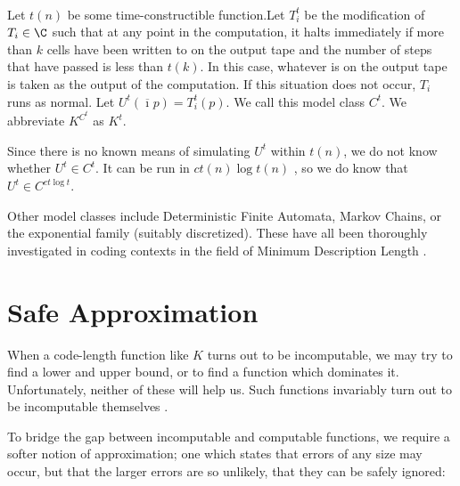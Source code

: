 \renewcommand*{\thefootnote}{\arabic{footnote}}

\begin{example}
\label{example:traditional-time-bounded}
\-\\ Let $t(n)$ be some time-constructible function.\footnotemark Let $T_i^t$ be the modification of $T_i \in \C$ such that at any point in the computation, it halts immediately if more than $k$ cells have been written to on the output tape and the number of steps that have passed is less than $t(k)$. In this case, whatever is on the output tape is taken as the output of the computation. If this situation does not occur, $T_i$ runs as normal. Let $U^t(\overline{\imath}p) = T^t_i(p)$. We call this model class $C^t$. We abbreviate $K^{C^t}$ as $K^t$. 

Since there is no known means of simulating $U^t$ within $t(n)$, we do not know whether $U^t \in C^t$. It can be run in $ct(n) \log t(n)$ \cite{DBLP:books/daglib/0087328,DBLP:journals/jacm/HennieS66}, so we do know that $U^t \in C^{ct\log t}$.
\end{example}


\noindent Other model classes include Deterministic Finite Automata, Markov Chains, or the exponential family (suitably discretized). These have all been thoroughly investigated in coding contexts in the field of Minimum Description Length \cite{grunwald2007minimum}.

\renewcommand*{\thefootnote}{\fnsymbol{footnote}}

\section{Safe Approximation}

When a code-length function like $K$ turns out to be incomputable, we may try to find a lower and upper bound, or to find a function which dominates it. Unfortunately, neither of these will help us. Such functions invariably turn out to be incomputable themselves \cite[Section~2.3]{DBLP:books/daglib/0087328}. 

To bridge the gap between incomputable and computable functions, we require a softer notion of approximation; one which states that errors of any size may occur, but that the larger errors are so unlikely, that they can be safely ignored: 

